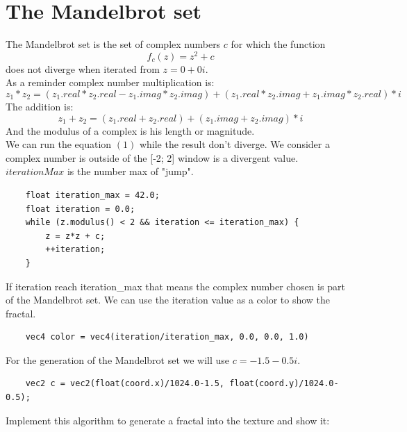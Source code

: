 \documentclass{article}
\begin{document}
\section{The Mandelbrot set}
The Mandelbrot set is the set of complex numbers $c$ for which the function
\begin{equation}
f_c(z) = z^2+c
\end{equation}
does not diverge when iterated from $z = 0+0i$.\\
As a reminder complex number multiplication is:
\begin{equation}
z_1*z_2 = (z_1.real*z_2.real-z_1.imag*z_2.imag) + (z_1.real*z_2.imag + z_1.imag*z_2.real)*i
\end{equation}
The addition is:
\begin{equation}
z_1 + z_2 = (z_1.real + z_2.real) + (z_1.imag + z_2.imag)*i
\end{equation}
And the modulus of a complex is his length or magnitude.\\
We can run the equation $(1)$ while the result don't diverge. We consider a complex number is outside of the [-2; 2] window is a divergent value. $iterationMax$ is the number max of "jump".
\begin{lstlisting}
	float iteration_max = 42.0;
	float iteration = 0.0;
	while (z.modulus() < 2 && iteration <= iteration_max) {
		z = z*z + c;
		++iteration;
	}
\end{lstlisting}
If iteration reach iteration\_max that means the complex number chosen is part of the Mandelbrot set. We can use the iteration value as a color to show the fractal.
\begin{lstlisting}
	vec4 color = vec4(iteration/iteration_max, 0.0, 0.0, 1.0)
\end{lstlisting}
For the generation of the Mandelbrot set we will use $c = -1.5 - 0.5i$.
\begin{lstlisting}
	vec2 c = vec2(float(coord.x)/1024.0-1.5, float(coord.y)/1024.0-0.5);
\end{lstlisting}
Implement this algorithm to generate a fractal into the texture and show it:
\end{document}
